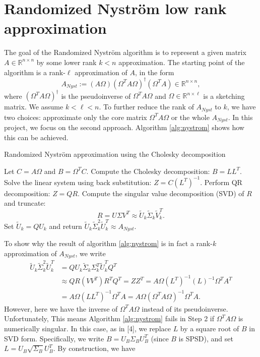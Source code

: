 \documentclass[a4paper, 12pt,oneside]{article}
\begin{document}
	\section{Randomized Nystr\"om low rank approximation}
	The goal of the Randomized Nystr\"om algorithm is to represent a given matrix $A \in \mathbb{R}^{n \times n}$ by some lower rank $k<n$ approximation. The starting point of the algorithm is a rank-$\ell$ approximation of $A$, in the form
	\[
	A_{Nyst} := (A\Omega)(\Omega^T A \Omega)^{\dagger}(\Omega^T A) \in \mathbb{R}^{n \times n},
	\]
	where $(\Omega^T A \Omega)^\dagger$ is the pseudoinverse of $\Omega^T A \Omega$ and $\Omega \in \mathbb{R}^{n \times \ell}$ is a sketching matrix. We assume $k < \ell < n$. To further reduce the rank of $A_{Nyst}$ to $k$, we have two choices: approximate only the core matrix $\Omega^T A \Omega$ or the whole $A_{Nyst}$. In this project, we focus on the second approach. Algorithm \ref{alg:nystrom} shows how this can be achieved.
	\begin{algorithm}[H]
	\caption{Randomized Nystr\"om approximation using the Cholesky decomposition}
	\label{alg:nystrom}
	\begin{algorithmic}[1]
	\State Let $C = A\Omega$ and $B = \Omega^T C$.
	\State Compute the Cholesky decomposition: $B = LL^T$.
	\State Solve the linear system using back substitution: $Z = C(L^T)^{-1}$.
	\State Perform QR decomposition: $Z = QR$.
	\State Compute the singular value decomposition (SVD) of $R$ and truncate:
	\[ R = U \Sigma V^T \approx \tilde{U}_k \tilde{\Sigma}_k \tilde{V}_k^T. \]
	\State Set $\tilde{U}_k = Q{U}_k$ and return $\tilde{U}_k \tilde{\Sigma}_k^2 \tilde{U}_k^T \approx A_{Nyst}$.
	\end{algorithmic}
	\end{algorithm}
	To show why the result of algorithm \ref{alg:nystrom} is in fact a rank-$k$ approximation of $A_{Nyst}$, we write
	\begin{align*}
	\tilde{U}_k \tilde{\Sigma}_k^2 \tilde{U}_k^T &= Q{U}_k \tilde{\Sigma}_k {\Sigma}_k^T \tilde{U}_k^T Q^T \\
	&\approx QR(VV^T)R^T Q^T = ZZ^T = A\Omega(L^T)^{-1}(L)^{-1}\Omega^T A^T \\
	&= A\Omega(LL^T)^{-1}\Omega^T A = A\Omega(\Omega^T A \Omega)^{-1}\Omega^T A.
	\end{align*}
	However, here we have the inverse of $\Omega^T A \Omega$ instead of its pseudoinverse. Unfortunately, This means Algorithm \ref{alg:nystrom} fails in Step 2 if $\Omega^T A \Omega$ is numerically singular. In this case, as in [4], we replace $L$ by a square root of $B$ in SVD form. Specifically, we write $B = U_B \Sigma_B U_B^T$ (since $B$ is SPSD), and set $L = U_B \sqrt{\Sigma_B} U_B^T$. By construction, we have
\end{document}
